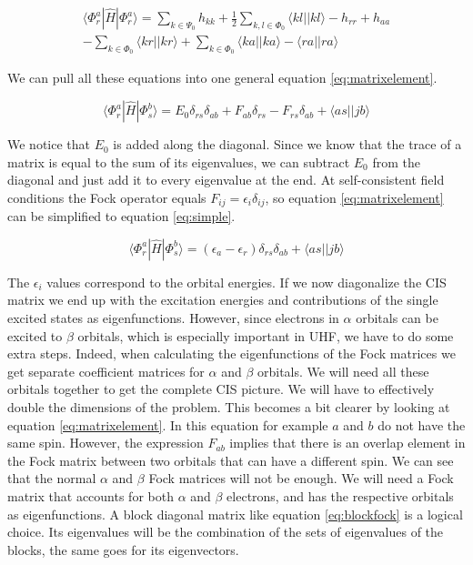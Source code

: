 \documentclass[twoside,twocolumn,9pt]{article}
\begin{document}
\begin{multline}\label{eq:exp3}
  \langle \Phi^a_r|\hat{H}|\Phi^a_r \rangle = \sum_{k \in \Psi_0}h_{kk} + \frac{1}{2}\sum_{k,l \in \Phi_0} \langle kl||kl \rangle - h_{rr} + h_{aa} \\ - \sum_{k \in \Phi_0} \langle
  kr || kr \rangle + \sum_{k \in \Phi_0} \langle ka||ka \rangle - \langle ra||ra \rangle
\end{multline}

We can pull all these equations into one general equation \eqref{eq:matrixelement}.

\begin{equation}\label{eq:matrixelement}
  \langle \Phi_r^a|\hat{H}|\Phi_s^b \rangle = E_0\delta_{rs}\delta_{ab} + F_{ab}\delta_{rs} - F_{rs}\delta_{ab} + \langle as || jb \rangle
\end{equation}

We notice that $E_0$ is added along the diagonal. Since we know that the trace of a matrix is equal to the sum of its eigenvalues, we can subtract $E_0$ from the diagonal and just
add it to every eigenvalue at the end. At self-consistent field conditions the Fock operator equals $F_{ij} = \epsilon_i\delta_{ij}$, so equation \eqref{eq:matrixelement} can be
simplified to equation \eqref{eq:simple}.

\begin{equation}\label{eq:simple}
  \langle \Phi_r^a|\hat{H}|\Phi_s^b \rangle = (\epsilon_a - \epsilon_r)\delta_{rs}\delta_{ab} + \langle as || jb \rangle
\end{equation}

The $\epsilon_i$ values correspond to the orbital energies. If we now diagonalize the CIS matrix we end up with the excitation energies and contributions of the single excited states as
eigenfunctions. However, since electrons in $\alpha$ orbitals can be excited to $\beta$ orbitals, which is especially important in UHF, we have to do some extra steps. Indeed, when
calculating the eigenfunctions of the Fock matrices we get separate coefficient matrices for $\alpha$ and $\beta$ orbitals. We will need all these orbitals together to get the complete
CIS picture. We will have to effectively double the dimensions of the problem. This becomes a bit clearer by looking at equation \eqref{eq:matrixelement}. In this equation for example
$a$ and $b$ do not have the same spin. However, the expression $F_{ab}$ implies that there is an overlap element in the Fock matrix between two orbitals that can have a different spin.
We can see that the normal $\alpha$ and $\beta$ Fock matrices will not be enough. We will need a Fock matrix that accounts for both $\alpha$ and $\beta$ electrons, and has the respective orbitals
as eigenfunctions. A block diagonal matrix like equation \eqref{eq:blockfock} is a logical choice. Its eigenvalues will be the combination of the sets of eigenvalues of the blocks,
the same goes for its eigenvectors.
\end{document}
